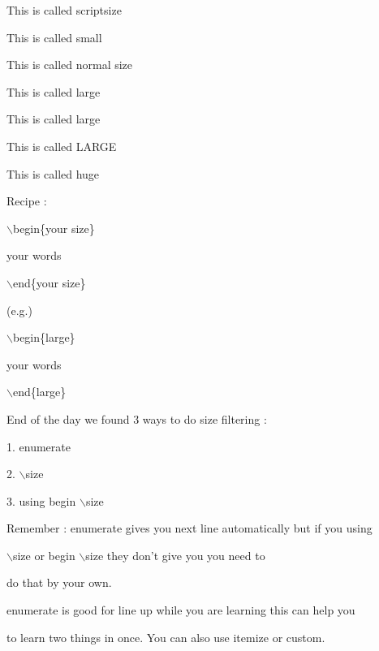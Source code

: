 \documentclass[11pt]{article}
\begin{document}
\begin{scriptsize}
This is called scriptsize
\end{scriptsize}

\begin{small}
This is called small
\end{small}

\begin{normalsize}
This is called normal size
\end{normalsize}

\begin{large}
This is called large
\end{large}

\begin{Large}
This is called large
\end{Large}

\begin{LARGE}
This is called LARGE
\end{LARGE}

\begin{huge}
This is called huge
\end{huge}

Recipe :

$\backslash$begin\{your size\}

your words

$\backslash$end\{your size\}

(e.g.)

$\backslash$begin\{large\}

your words

$\backslash$end\{large\}

\vspace{1cm}

End of the day we found 3 ways to do size filtering :

1. enumerate

2. $\backslash$size

3. using begin $\backslash$size 

Remember : enumerate gives you next line automatically but if you using

$\backslash$size or begin $\backslash$size they don't give you you need to

do that by your own.

\vspace{1cm}

enumerate is good for line up while you are learning this can help you

to learn two things in once. You can also use itemize or custom.
\end{document}
